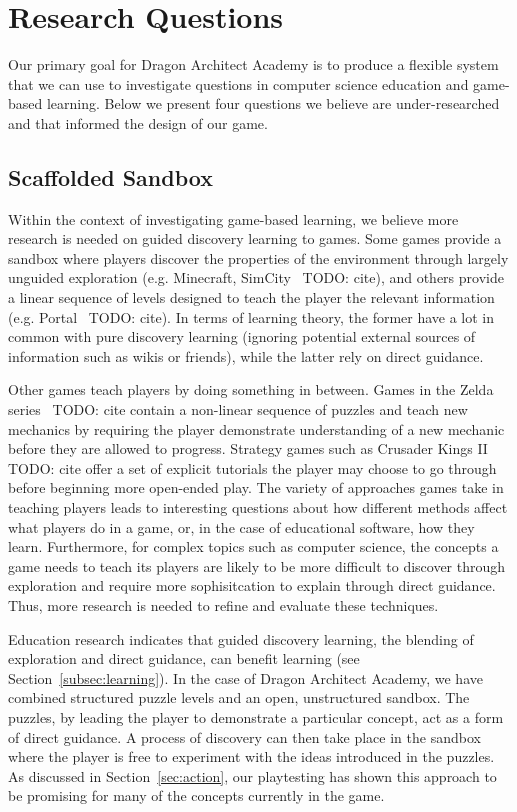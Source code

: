 \documentclass{sig-alternate}
\newcommand{\TODO}[1]{{\color{red} TODO: #1}}
\newcommand{\gametitle}{{\color{RoyalPurple} Dragon Architect Academy}}
\begin{document}
\section{Research Questions}
\label{sec:research}
Our primary goal for \gametitle{} is to produce a flexible system that we can use to investigate questions in computer science education and game-based learning. 
Below we present four questions we believe are under-researched and that informed the design of our game. 

\subsection{Scaffolded Sandbox}
Within the context of investigating game-based learning, we believe more research is needed on guided discovery learning to games. 
Some games provide a sandbox where players discover the properties of the environment through largely unguided exploration (e.g. Minecraft, SimCity~\TODO{cite}), and others provide a linear sequence of levels designed to teach the player the relevant information (e.g. Portal~\TODO{cite}). 
In terms of learning theory, the former have a lot in common with pure discovery learning (ignoring potential external sources of information such as wikis or friends), while the latter rely on direct guidance. 

Other games teach players by doing something in between. 
Games in the Zelda series~\TODO{cite} contain a non-linear sequence of puzzles and teach new mechanics by requiring the player demonstrate understanding of a new mechanic before they are allowed to progress. 
Strategy games such as Crusader Kings II~\TODO{cite} offer a set of explicit tutorials the player may choose to go through before beginning more open-ended play.
The variety of approaches games take in teaching players leads to interesting questions about how different methods affect what players do in a game, or, in the case of educational software, how they learn. 
Furthermore, for complex topics such as computer science, the concepts a game needs to teach its players are likely to be more difficult to discover through exploration and require more sophisitcation to explain through direct guidance. Thus, more research is needed to refine and evaluate these techniques. 

Education research indicates that guided discovery learning, the blending of exploration and direct guidance, can benefit learning (see Section~\ref{subsec:learning}). 
In the case of \gametitle{}, we have combined structured puzzle levels and an open, unstructured sandbox. 
The puzzles, by leading the player to demonstrate a particular concept, act as a form of direct guidance. 
A process of discovery can then take place in the sandbox where the player is free to experiment with the ideas introduced in the puzzles. 
As discussed in Section~\ref{sec:action}, our playtesting has shown this approach to be promising for many of the concepts currently in the game. 
\end{document}
